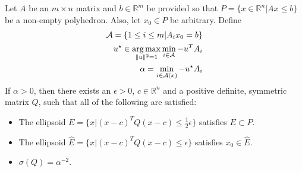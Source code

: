 
\begin{lemma}
\label{ellipsoid_exists}
Let  $A$ be an $m \times n$ matrix and $b \in \mathbb R^m$ be provided so that $P = \{x \in \mathbb R^n | Ax \le b \}$ be a non-empty polyhedron.
Also, let $x_0 \in P$ be arbitrary.
Define
\begin{align}
\mathcal A = \{1 \le i \le m | A_i x_0 = b \} \label{active_polyhedron_constraints} \\
u^{\star} \in \operatorname*{arg\,max}_{\|u\|^2 = 1} \min_{i \in \mathcal A} - u^T A_i \label{polyhedrons_u} \\
\alpha = \min_{i \in \mathcal A(x)} -u^{\star}A_i \label{polyhedrons_alpha}
\end{align}
If $\alpha > 0$, then there exists an $\epsilon > 0$, $c \in \mathbb R^n$  and a positive definite, symmetric matrix $Q$, 
such that all of the following are satisfied:
\begin{itemize}
\item The ellipsoid $E = \{x | (x - c)^TQ(x - c) \le \frac 1 2 \epsilon \}$ satisfies $E \subset P$.
\item The ellipsoid $\hat E = \{x | (x - c)^TQ(x - c) \le  \epsilon \}$ satisfies $x_0 \in \hat E$.
\item $\sigma(Q) = \alpha^{-2}$.
\end{itemize}
\end{lemma}

